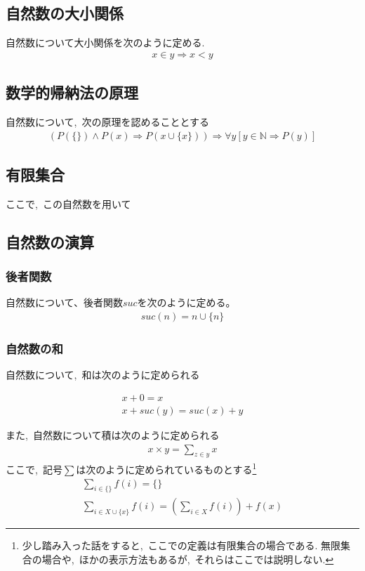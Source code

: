 \documentclass[hyperref,a4paper,12pt]{kininaruki}
\begin{document}
\subsection{自然数の大小関係}
自然数について大小関係を次のように定める.
\begin{align}
    x\in y\Rightarrow x < y
\end{align}
\subsection{数学的帰納法の原理}
自然数について,\, 次の原理を認めることとする
\begin{align}
    (P(\{\}) \land P(x)\Rightarrow P(x\cup\{x\}))\Rightarrow\forall y [y\in\mathbb{N}\Rightarrow P(y)]
\end{align}
\subsection{有限集合}
ここで,\, この自然数を用いて
\subsection{自然数の演算}
\subsubsection{後者関数}
自然数について、後者関数$suc$を次のように定める。
\begin{align}
    suc(n) = n\cup\{n\}
\end{align}
\subsubsection{自然数の和}
自然数について,\, 和は次のように定められる

\begin{align}
    x + 0 = x\\
    x + suc(y) = suc(x) + y
\end{align}

また,\, 自然数について積は次のように定められる
\begin{align}
    x\times y = \sum_{z\in y} x
\end{align}
ここで,\, 記号$\sum$は次のように定められているものとする\footnote{少し踏み入った話をすると,\, %
ここでの定義は有限集合の場合である.%
無限集合の場合や,\, ほかの表示方法もあるが,\, それらはここでは説明しない.}
\begin{align}
    \sum_{i\in \{\}} f(i) = \{\}\\
    \sum_{i\in X\cup\{x\}} f(i) =\left(\sum_{i \in X} f(i)\right) + f(x)
\end{align}
\end{document}
